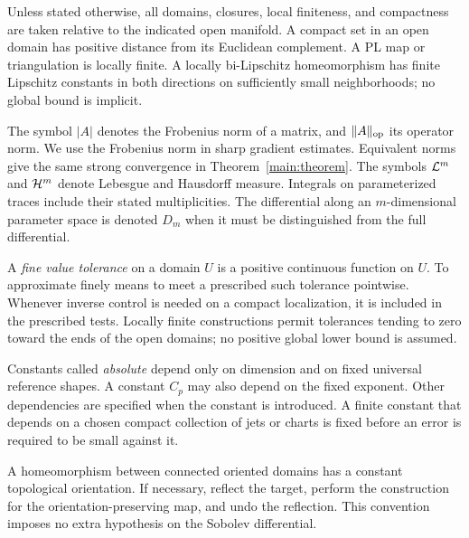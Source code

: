 Unless stated otherwise, all domains, closures, local finiteness, and compactness are taken relative to the indicated open manifold. A compact set in an open domain has positive distance from its Euclidean complement. A PL map or triangulation is locally finite. A locally bi-Lipschitz homeomorphism has finite Lipschitz constants in both directions on sufficiently small neighborhoods; no global bound is implicit.

The symbol $|A|$ denotes the Frobenius norm of a matrix, and $\|A\|_{\mathrm{op}}$ its operator norm. We use the Frobenius norm in sharp gradient estimates. Equivalent norms give the same strong convergence in Theorem~\ref{main:theorem}. The symbols $\mathcal L^m$ and $\mathcal H^m$ denote Lebesgue and Hausdorff measure. Integrals on parameterized traces include their stated multiplicities. The differential along an $m$-dimensional parameter space is denoted $D_m$ when it must be distinguished from the full differential.

A \emph{fine value tolerance} on a domain $U$ is a positive continuous function on $U$. To approximate finely means to meet a prescribed such tolerance pointwise. Whenever inverse control is needed on a compact localization, it is included in the prescribed tests. Locally finite constructions permit tolerances tending to zero toward the ends of the open domains; no positive global lower bound is assumed.

Constants called \emph{absolute} depend only on dimension and on fixed universal reference shapes. A constant $C_p$ may also depend on the fixed exponent. Other dependencies are specified when the constant is introduced. A finite constant that depends on a chosen compact collection of jets or charts is fixed before an error is required to be small against it.

A homeomorphism between connected oriented domains has a constant topological orientation. If necessary, reflect the target, perform the construction for the orientation-preserving map, and undo the reflection. This convention imposes no extra hypothesis on the Sobolev differential.

